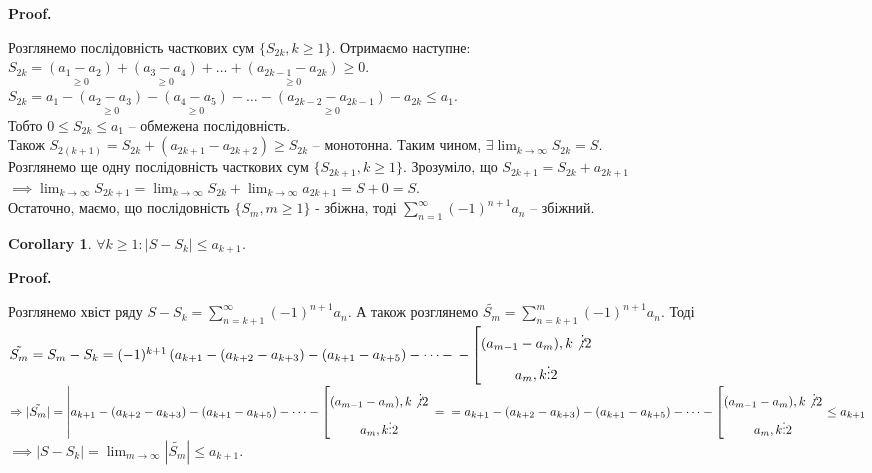 \documentclass[a4paper, 10pt]{article}
\makeatletter
\def\huge{\displaystyle}
\def\qed{$\blacksquare$}
\theoremstyle{theoremdd}
\theoremstyle{theoremdd}
\theoremstyle{theoremdd}
\theoremstyle{theoremdd}
\theoremstyle{theoremdd}
\theoremstyle{theoremdd}
\theoremstyle{theoremdd}
\theoremstyle{theoremdd}
\theoremstyle{theoremdd}
\newtheorem{corollary}[theorem]{Corollary}
\renewenvironment{proof}[1][Proof.\\]{\par
\pushQED{\hfill \qed}%
\normalfont \topsep6\p@\@plus6\p@\relax
\trivlist
\item\relax
{\bfseries
#1\@addpunct{.}}\hspace\labelsep\ignorespaces
}{%
\popQED\endtrivlist\@endpefalse
}
\makeatother
\begin{document}
\begin{proof}
Розглянемо послідовність часткових сум $\{S_{2k}, k \geq 1 \}$. Отримаємо наступне:\\
$S_{2k} = \underset{\geq 0}{(a_1 - a_2)} + \underset{\geq 0}{(a_3 - a_4)} + \dots + \underset{\geq 0}{(a_{2k-1} - a_{2k})} \geq 0$.\\
$S_{2k} = a_1 - \underset{\geq 0}{(a_2 - a_3)} - \underset{\geq 0}{(a_4 - a_5)} - \dots - \underset{\geq 0}{(a_{2k-2} - a_{2k-1})} - a_{2k} \leq a_1$.\\
Тобто $0 \leq S_{2k} \leq a_1$ -- обмежена послідовність.\\
Також $S_{2(k+1)} = S_{2k} + (a_{2k+1}-a_{2k+2}) \geq S_{2k}$ -- монотонна. Таким чином, $\exists \huge \lim_{k \to \infty} S_{2k} = S$.\\
Розглянемо ще одну послідовність часткових сум $\{S_{2k+1}, k \geq 1\}$. Зрозуміло, що $S_{2k+1} = S_{2k} + a_{2k+1}$\\
$\implies \huge \lim_{k \to \infty} S_{2k+1} = \lim_{k \to \infty} S_{2k} + \lim_{k \to \infty} a_{2k+1} = S + 0 = S$. \\
Остаточно, маємо, що послідовність $\{S_m, m \geq 1\}$ - збіжна, тоді $\huge \sum_{n=1}^\infty (-1)^{n+1}a_n$ -- збіжний.
\end{proof}

\begin{corollary}
$\forall k \geq 1: |S-S_k| \leq a_{k+1}$.
\end{corollary}

\begin{proof}
Розглянемо хвіст ряду $S-S_k = \huge \sum_{n=k+1}^{\infty} (-1)^{n+1}a_n$. А також розглянемо $\tilde{S_m} = \huge \sum_{n=k+1}^{m} (-1)^{n+1}a_n$. Тоді\\
$\tilde{S_m} = S_m - S_k = (-1)^{k+1} \left(a_{k+1}-(a_{k+2}-a_{k+3})-(a_{k+1}-a_{k+5}) - \dots - \right. \left. - \left[ \begin{gathered} (a_{m-1}-a_m), k \not \vdots 2 \\ a_m, k \vdots 2 \end{gathered} \right. \right.$\\
$\Rightarrow |\tilde{S_m}| = \left|a_{k+1}-(a_{k+2}-a_{k+3})-(a_{k+1}-a_{k+5}) - \dots - \left[ \begin{gathered} (a_{m-1}-a_m), k \not \vdots 2 \\ a_m, k \vdots 2 \end{gathered} \right. \right. = \\
= a_{k+1}-(a_{k+2}-a_{k+3})-(a_{k+1}-a_{k+5}) - \dots - \left[ \begin{gathered} (a_{m-1}-a_m), k \not \vdots 2 \\ a_m, k \vdots 2 \end{gathered} \right. \leq a_{k+1}$\\
$\implies |S - S_k| = \huge \lim_{m \to \infty} |\tilde{S_m}| \leq a_{k+1}$. 
\end{proof}
\end{document}
